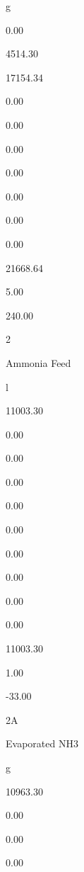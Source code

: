 \documentclass[a4paper,portrait,12pt]{article}
\begin{document}
\begin{flushleft}
g
\end{flushleft}


0.00


4514.30


17154.34


0.00


0.00


0.00


0.00


0.00


0.00


0.00


21668.64


5.00


240.00





2


\begin{flushleft}
Ammonia Feed
\end{flushleft}


\begin{flushleft}
l
\end{flushleft}


11003.30


0.00


0.00


0.00


0.00


0.00


0.00


0.00


0.00


0.00


11003.30


1.00


-33.00





\begin{flushleft}
2A
\end{flushleft}


\begin{flushleft}
Evaporated NH3
\end{flushleft}


\begin{flushleft}
g
\end{flushleft}


10963.30


0.00


0.00


0.00
\end{document}
